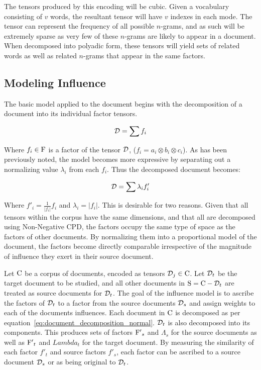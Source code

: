 \documentclass[../dissertation.tex]{subfiles}
\begin{document}
The tensors produced by this encoding will be cubic.  Given a
vocabulary consisting of $v$ words, the resultant tensor will have $v$
indexes in each mode.  The tensor can represent the frequency of all
possible $n$-grams, and as such will be extremely sparse as very few
of these $n$-grams are likely to appear in a document.  When
decomposed into polyadic form, these tensors will yield sets of
related words as well as related $n$-grams that appear in the same
factors.  



\subsection{Modeling Influence}
The basic model applied to the document begins with the decomposition
of a document into its individual factor tensors.

\begin{equation} \label{eq:document_decomposition}
  \mathcal{D} = \sum f_i 
\end{equation}

Where $f_i\in \mathrm{F}$ is a factor of the tensor $\mathcal{D}$, ($f_i=a_i
\otimes b_i \otimes c_i$).  As has been previously noted, the model
becomes more expressive by separating out a normalizing value
$\lambda_i$ from each $f_i$.  Thus the decomposed document becomes:

\begin{equation} \label{eq:document_decomposition_normal}
  \mathcal{D} = \sum \lambda_i f'_i
\end{equation}

Where $f'_i=\frac{1}{|f_i|} f_i$ and $\lambda_i = |f_i|$.  This is
desirable for two reasons.  Given that all tensors within the corpus
have the same dimensions, and that all are decomposed using
Non-Negative CPD, the factors occupy the same type of space as the
factors of other documents.  By normalizing them into a proportional
model of the document, the factors become directly comparable
irrespective of the magnitude of influence they exert in their source
document.

Let $\mathrm{C}$ be a corpus of documents, encoded as tensors $\mathcal{D}_j
\in \mathrm{C}$.  Let $\mathcal{D}_t$ be the target document to be studied,
and all other documents in $\mathrm{S}=\mathrm{C} - \mathcal{D}_t$ are treated
as source documents for $\mathcal{D}_t$.  The goal of the influence model
is to ascribe the factors of $\mathcal{D}_t$ to a factor from the source
documents $\mathcal{D}_s$ and assign weights to each of the documents
influences. Each document in $\mathrm{C}$ is decomposed as per
equation~\ref{eq:document_decomposition_normal}.  $\mathcal{D}_t$ is also
decomposed into its components.  This produces sets of factors
$\mathrm{F'}_s$ and $\Lambda_s$ for the source documents as well as
$\mathrm{F'}_t$ and $Lambda_t$ for the target document.  By measuring the
similarity of each factor $f'_t$ and source factors $f'_s$, each
factor can be ascribed to a source document $\mathcal{D}_s$ or as being
original to $\mathcal{D}_t$.
\end{document}
